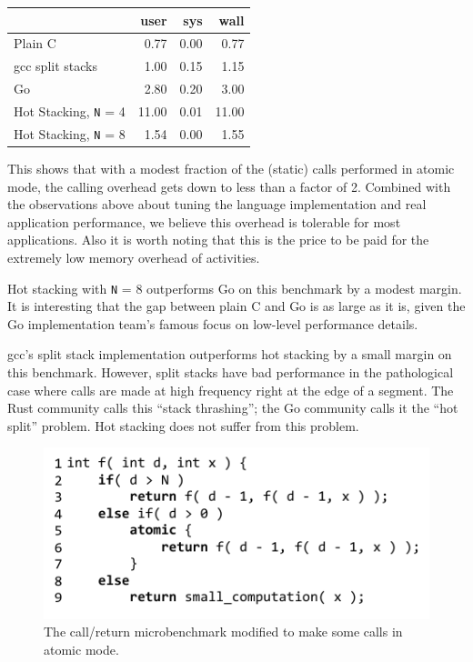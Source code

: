 \documentclass[preprint, 10pt, numbers]{sigplanconf}
\begin{document}
\vspace{1em}
\begin{tabular}{|l|r|r|r|}
  \hline
   & user & sys & wall \\
  \hline
  \hline
  Plain C & 0.77 & 0.00 & 0.77 \\
  \hline
  gcc split stacks\footnotemark{} & 1.00 & 0.15 & 1.15 \\
  \hline
  Go & 2.80 & 0.20 & 3.00 \\
  \hline
  Hot Stacking, \texttt{N} = 4 & 11.00 & 0.01 & 11.00 \\
  \hline
  Hot Stacking, \texttt{N} = 8 & 1.54 & 0.00 & 1.55 \\
  \hline
\end{tabular}
\vspace{1em}


This shows that with a modest fraction of the (static) calls performed in atomic mode, the calling overhead gets down to less than a factor of 2.
Combined with the observations above about tuning the language implementation and real application performance, we believe this overhead is tolerable for most applications.
Also it is worth noting that this is the price to be paid for the extremely low memory overhead of activities.

Hot stacking with \texttt{N} = 8 outperforms Go on this benchmark by a modest margin.
It is interesting that the gap between plain C and Go is as large as it is, given the Go implementation team's famous focus on low-level performance details.

gcc's split stack implementation outperforms hot stacking by a small margin on this benchmark.
However, split stacks have bad performance in the pathological case where calls are made at high frequency right at the edge of a segment.
The Rust community calls this ``stack thrashing''; the Go community calls it the ``hot split'' problem.
Hot stacking does not suffer from this problem.

\begin{figure}
\includegraphics{just_calling_n_benchmark}
\caption{The call/return microbenchmark modified to make some calls in atomic mode.}
\label{fig:micro_calling_n}
\end{figure}
\end{document}
